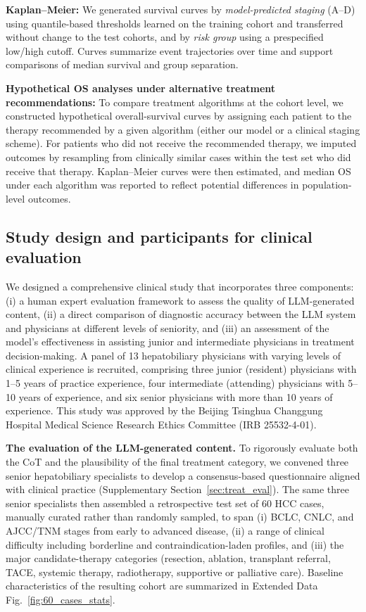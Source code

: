 \documentclass{article}
\begin{document}
\textbf{Kaplan–Meier:} We generated survival curves by \emph{model-predicted staging} (A–D) using quantile-based thresholds learned on the training cohort and transferred without change to the test cohorts, and by \emph{risk group} using a prespecified low/high cutoff. Curves summarize event trajectories over time and support comparisons of median survival and group separation.

\textbf{Hypothetical OS analyses under alternative treatment recommendations:}
To compare treatment algorithms at the cohort level, we constructed hypothetical overall-survival curves by assigning each patient to the therapy recommended by a given algorithm (either our model or a clinical staging scheme). For patients who did not receive the recommended therapy, we imputed outcomes by resampling from clinically similar cases within the test set who did receive that therapy. Kaplan–Meier curves were then estimated, and median OS under each algorithm was reported to reflect potential differences in population-level outcomes.

\subsection{Study design and participants for clinical evaluation}
We designed a comprehensive clinical study that incorporates three components: (i) a human expert evaluation framework to assess the quality of LLM-generated content, (ii) a direct comparison of diagnostic accuracy between the LLM system and physicians at different levels of seniority, and (iii) an assessment of the model’s effectiveness in assisting junior and intermediate physicians in treatment decision-making. A panel of 13 hepatobiliary physicians with varying levels of clinical experience is recruited, comprising three junior (resident) physicians with 1–5 years of practice experience, four intermediate (attending) physicians with 5–10 years of experience, and six senior physicians with more than 10 years of experience. This study was approved by the Beijing Tsinghua Changgung Hospital Medical Science Research Ethics Committee (IRB 25532-4-01).

\textbf{The evaluation of the LLM-generated content.}
To rigorously evaluate both the CoT and the plausibility of the final treatment category, we convened three senior hepatobiliary specialists to develop a consensus-based questionnaire aligned with clinical practice (Supplementary Section~\ref{sec:treat_eval}). The same three senior specialists then assembled a retrospective test set of 60 HCC cases, manually curated rather than randomly sampled, to span (i) BCLC, CNLC, and AJCC/TNM stages from early to advanced disease, (ii) a range of clinical difficulty including borderline and contraindication-laden profiles, and (iii) the major candidate-therapy categories (resection, ablation, transplant referral, TACE, systemic therapy, radiotherapy, supportive or palliative care). Baseline characteristics of the resulting cohort are summarized in Extended Data Fig.~\ref{fig:60_cases_stats}.
\end{document}

